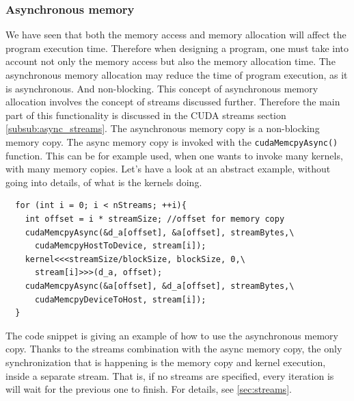 \subsubsection{Asynchronous memory}
  \label{subsub:async_mem}
  We have seen that both the memory access and memory allocation will affect the program execution time. 
  Therefore when designing a program, one must take into account not only the memory access but also 
  the memory allocation time. 
    The asynchronous memory allocation may reduce the time of program execution, as it is asynchronous. And 
    non-blocking. This concept of asynchronous memory allocation involves the concept of streams discussed 
    further. 
    Therefore the main part of this functionality is discussed in the CUDA streams section \autoref{subsub:async_streams}.
  The asynchronous memory copy is a non-blocking memory copy. The async memory copy is 
  invoked with the \verb|cudaMemcpyAsync()| function. This can be for example used, when one wants to invoke 
  many kernels, with many memory copies. Let's have a look at an abstract example, without going into details, of what is the kernels 
  doing. 
  \begin{listing}
  \begin{verbatim}
  for (int i = 0; i < nStreams; ++i){
    int offset = i * streamSize; //offset for memory copy 
    cudaMemcpyAsync(&d_a[offset], &a[offset], streamBytes,\
      cudaMemcpyHostToDevice, stream[i]);
    kernel<<<streamSize/blockSize, blockSize, 0,\
      stream[i]>>>(d_a, offset);
    cudaMemcpyAsync(&a[offset], &d_a[offset], streamBytes,\
      cudaMemcpyDeviceToHost, stream[i]);
  }
  \end{verbatim}
  \caption{The code snippet \cite{async_memcpy} is giving an example of how to use the asynchronous memory copy. 
Thanks to the streams combination with the async memory copy, the only synchronization that is happening is the memory copy and kernel execution, inside 
a separate stream. That is, if no streams are specified, every iteration is will wait for the previous one to finish. For details, see \autoref{sec:streams}.}
\end{listing}

